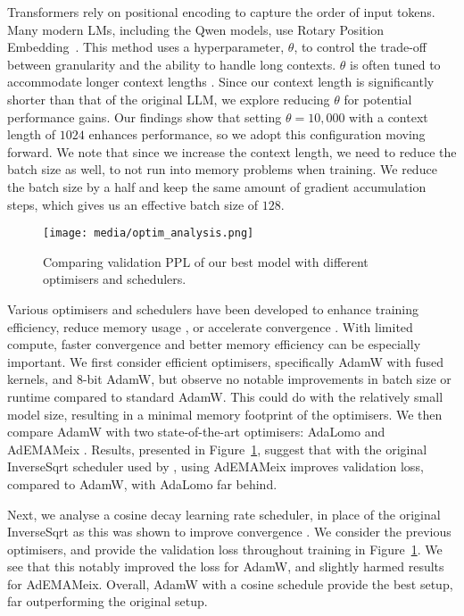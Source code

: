  Transformers rely on positional encoding to capture the order of input tokens. Many modern LMs, including the Qwen models, use Rotary Position Embedding~\citep{su2023roformerenhancedtransformerrotary}. This method uses a hyperparameter, $\theta$, to control the trade-off between granularity and the ability to handle long contexts. $\theta$ is often tuned to accommodate longer context lengths \citep{qwen2, roziere2023code}. Since our context length is significantly shorter than that of the original LLM, we explore reducing $\theta$ for potential performance gains. Our findings show that setting $\theta=10,000$ with a context length of $1024$ enhances performance, so we adopt this configuration moving forward. We note that since we increase the context length, we need to reduce the batch size as well, to not run into memory problems when training. We reduce the batch size by a half and keep the same amount of gradient accumulation steps, which gives us an effective batch size of $128$.

\begin{figure}[t!]
  \texttt{[image: media/optim\_analysis.png]}
  \caption{Comparing validation PPL of our best model with different optimisers and schedulers.}
  \label{fig:optim}
\end{figure}

 Various optimisers and schedulers have been developed to enhance training efficiency, reduce memory usage \citep{shazeer2018adafactoradaptivelearningrates, dettmers20228bitoptimizersblockwisequantization}, or accelerate convergence \citep{pagliardini2024ademamix, chen2023lion}. With limited compute, faster convergence and better memory efficiency can be especially important. We first consider efficient optimisers, specifically AdamW with fused kernels, and $8$-bit AdamW, but observe no notable improvements in batch size or runtime compared to standard AdamW. This could do with the relatively small model size, resulting in a minimal memory footprint of the optimisers. We then compare AdamW with two state-of-the-art optimisers: AdaLomo \cite{lv2023adalomo} and AdEMAMeix \citep{pagliardini2024ademamix}. Results, presented in Figure~\ref{fig:optim}, suggest that with the original InverseSqrt scheduler used by \citet{twist}, using AdEMAMeix improves validation loss, compared to AdamW, with AdaLomo far behind.

Next, we analyse a cosine decay learning rate scheduler, in place of the original InverseSqrt as this was shown to improve convergence \cite{loshchilov2016sgdr}. We consider the previous optimisers, and provide the validation loss throughout training in Figure~\ref{fig:optim}. We see that this notably improved the loss for AdamW, and slightly harmed results for AdEMAMeix. Overall, AdamW with a cosine schedule provide the best setup, far outperforming the original setup.

